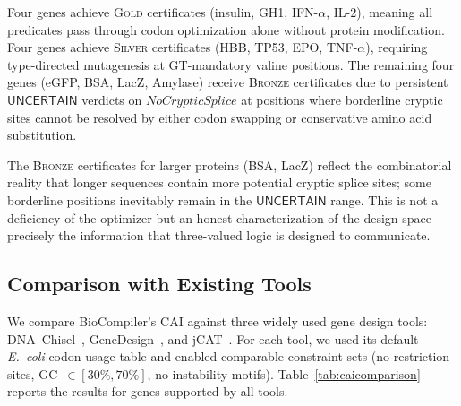 \documentclass[acmsmall,review,anonymous]{acmart}
\newcommand{\UNCERTAIN}{\ensuremath{\mathsf{UNCERTAIN}}\xspace}
\newcommand{\GOLD}{\textsc{Gold}\xspace}
\newcommand{\SILVER}{\textsc{Silver}\xspace}
\newcommand{\BRONZE}{\textsc{Bronze}\xspace}
\begin{document}
Four genes achieve \GOLD{} certificates (insulin, GH1, IFN-$\alpha$,
IL-2), meaning all predicates pass through codon optimization alone
without protein modification.  Four genes achieve \SILVER{} certificates
(HBB, TP53, EPO, TNF-$\alpha$), requiring type-directed mutagenesis at
GT-mandatory valine positions.  The remaining four genes (eGFP, BSA,
LacZ, Amylase) receive \BRONZE{} certificates due to persistent
\UNCERTAIN{} verdicts on $\mathit{NoCrypticSplice}$ at positions where
borderline cryptic sites cannot be resolved by either codon swapping or
conservative amino acid substitution.

The \BRONZE{} certificates for larger proteins (BSA, LacZ) reflect the
combinatorial reality that longer sequences contain more potential
cryptic splice sites; some borderline positions inevitably remain in the
\UNCERTAIN{} range.  This is not a deficiency of the optimizer but an
honest characterization of the design space---precisely the information
that three-valued logic is designed to communicate.

\subsection{Comparison with Existing Tools}\label{sec:comparison}

We compare BioCompiler's CAI against three widely used gene design tools:
DNA~Chisel~\cite{piret2020dnachisel},
GeneDesign~\cite{richardson2006genedesign}, and
jCAT~\cite{gage2006jcat}.  For each tool, we used its default
\emph{E.~coli} codon usage table and enabled comparable constraint sets
(no restriction sites, GC~$\in [30\%, 70\%]$, no instability motifs).
Table~\ref{tab:caicomparison} reports the results for genes supported by
all tools.
\end{document}
